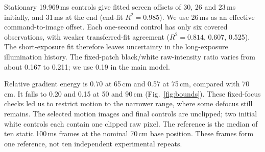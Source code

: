 Stationary 19.969\,ms controls give fitted screen offsets of 30, 26 and 23\,ms initially, and 31\,ms at the end (end-fit $R^2=0.985$). We use 26\,ms as an effective command-to-image offset. Each one-second control has only six covered observations, with weaker transferred-fit agreement ($R^2=0.814$, 0.607, 0.525). The short-exposure fit therefore leaves uncertainty in the long-exposure illumination history. The fixed-patch black/white raw-intensity ratio varies from about 0.167 to 0.211; we use 0.19 in the main model.

Relative gradient energy is 0.70 at 65\,cm and 0.57 at 75\,cm, compared with 70\,cm. It falls to 0.20 and 0.15 at 50 and 90\,cm (Fig.~\ref{fig:bounds}). These fixed-focus checks led us to restrict motion to the narrower range, where some defocus still remains. The selected motion images and final controls are unclipped; two initial white controls each contain one clipped raw pixel. The reference is the median of ten static 100\,ms frames at the nominal 70\,cm base position. These frames form one reference, not ten independent experimental repeats.
